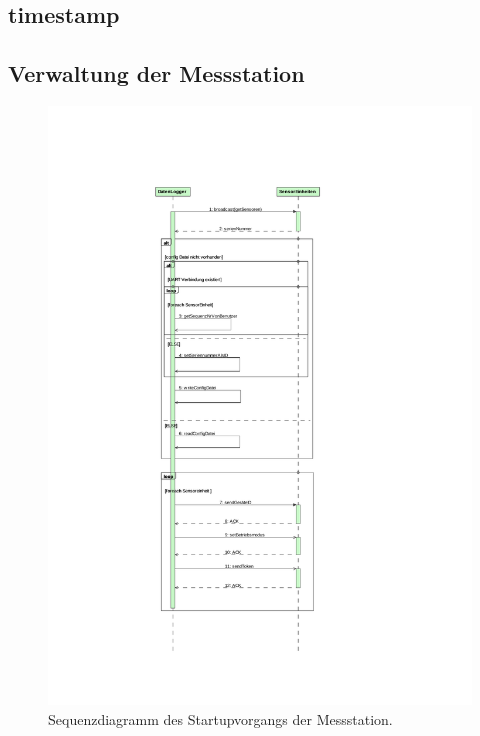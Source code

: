 \subsection{\gls{timestamp}}\label{subsec.sw_timestamp}

\subsection{Verwaltung der Messstation}\label{subsec.sw_busverwaltung}

\begin{figure}
	\centering
		\includegraphics[height=0.9\textheight]{images/magicdraw/StartUpSequenz.pdf}
	\caption{Sequenzdiagramm des Startupvorgangs der Messstation.}
	\label{fig.seq_startup}
\end{figure}

